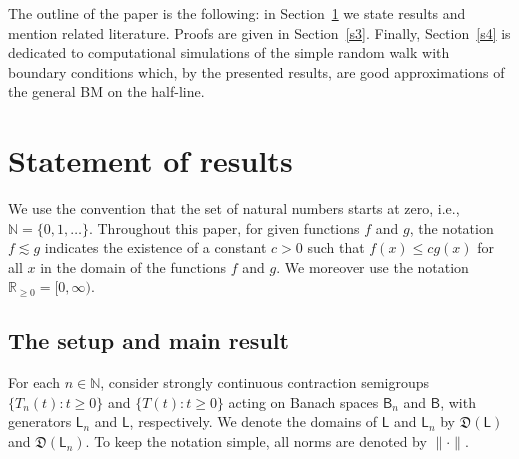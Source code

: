 \documentclass[12pt,a4paper]{article}
\theoremstyle{plain}
\theoremstyle{remark}
\newcommand{\msf}[1]{{\mathsf #1}}
\newcommand{\mf}[1]{{\mathfrak #1}}
\newcommand{\bb}[1]{{\mathbb #1}}
\newcommand{\norm}[1]{\lVert#1\rVert}
\begin{document}
	The outline of the paper is the following: in Section~\ref{s2} we state results and mention related literature. Proofs are given in  Section~\ref{s3}. Finally, Section~\ref{s4} is dedicated to computational simulations of the simple random walk with boundary conditions which, by the presented results, are good approximations of the general BM on the half-line.
	
	
	
	
	
	\section{Statement of results}\label{s2}
	
	We use the convention that the set of natural numbers starts at zero, i.e., $\bb{N}=\{0,1,\ldots\}$.
	Throughout this paper, for given functions $f$ and $g$, the notation $f \lesssim g$ indicates the existence of a constant $c > 0$ such that $f(x) \leq cg(x)$ for all $x$ in the domain of the functions $f$ and $g$. We moreover use the notation $\bb R_{\geq 0}=[0,\infty)$.
	\subsection{The setup and main result}
	
	For each $n \in \bb{N}$, consider strongly continuous contraction semigroups $\{T_n(t) : t \geq 0\}$ and $\{T(t) : t \geq 0\}$ acting on Banach spaces $\msf{B}_n$ and $\msf{B}$, with generators $\msf L_n$ and $\msf L$, respectively. We denote the domains of $\msf{L}$ and $\msf{L}_n$ by $\mf{D} (\msf{L})$ and $\mf{D}(\msf{L}_n)$. To keep the notation simple, all norms are denoted by $\norm{\cdot}$.
	
	
	
\end{document}
